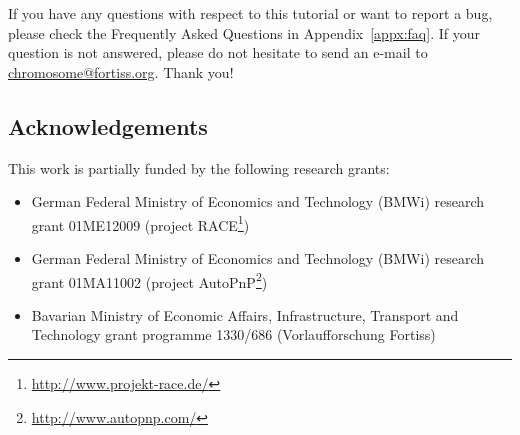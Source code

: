 If you have any questions with respect to this tutorial or want to report a bug,
please check the Frequently Asked Questions in Appendix~\ref{appx:faq}.
If your question is not answered, please do not hesitate to send an e-mail to \url{chromosome@fortiss.org}. Thank you!

\subsection{Acknowledgements}

This work is partially funded by the following research grants:
\begin{itemize}
	\item German Federal Ministry of Economics and Technology (BMWi) research grant 01ME12009
		(project RACE\footnote{\url{http://www.projekt-race.de/}})
	\item German Federal Ministry of Economics and Technology (BMWi) research grant 01MA11002
		(project AutoPnP\footnote{\url{http://www.autopnp.com/}})
	\item Bavarian Ministry of Economic Affairs, Infrastructure, Transport and Technology grant programme 1330/686
		(Vorlaufforschung Fortiss)
\end{itemize}